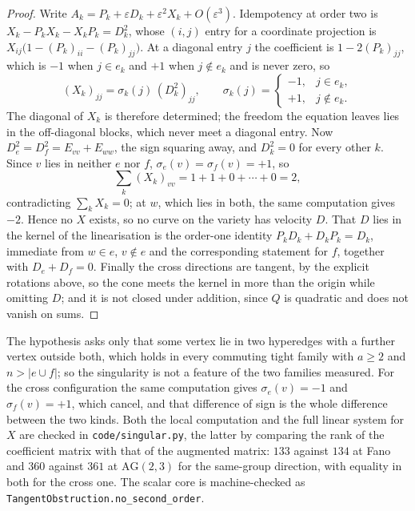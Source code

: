 \documentclass[11pt]{article}
\theoremstyle{remark}
\begin{document}
\begin{proof}
Write $A_k=P_k+\varepsilon D_k+\varepsilon^2X_k+O(\varepsilon^3)$. Idempotency at order two is
$X_k-P_kX_k-X_kP_k=D_k^2$, whose $(i,j)$ entry for a coordinate projection is
$X_{ij}\bigl(1-(P_k)_{ii}-(P_k)_{jj}\bigr)$. At a diagonal entry $j$ the coefficient is
$1-2(P_k)_{jj}$, which is $-1$ when $j\in e_k$ and $+1$ when $j\notin e_k$ and is never zero, so
\[
(X_k)_{jj}=\sigma_k(j)\,(D_k^2)_{jj},\qquad
\sigma_k(j)=\begin{cases}-1,& j\in e_k,\\ +1,& j\notin e_k.\end{cases}
\]
The diagonal of $X_k$ is therefore determined; the freedom the equation leaves lies in the
off-diagonal blocks, which never meet a diagonal entry. Now $D_e^2=D_f^2=E_{vv}+E_{ww}$, the sign
squaring away, and $D_k^2=0$ for every other $k$. Since $v$ lies in neither $e$ nor $f$,
$\sigma_e(v)=\sigma_f(v)=+1$, so
\[
\sum_k(X_k)_{vv}=1+1+0+\cdots+0=2,
\]
contradicting $\sum_kX_k=0$; at $w$, which lies in both, the same computation gives $-2$. Hence no
$X$ exists, so no curve on the variety has velocity $D$. That $D$ lies in the kernel of the
linearisation is the order-one identity $P_kD_k+D_kP_k=D_k$, immediate from $w\in e$, $v\notin e$
and the corresponding statement for $f$, together with $D_e+D_f=0$. Finally the cross directions
are tangent, by the explicit rotations above, so the cone meets the kernel in more than the
origin while omitting $D$; and it is not closed under addition, since $Q$ is quadratic and does not
vanish on sums.
\end{proof}

The hypothesis asks only that some vertex lie in two hyperedges with a further vertex outside
both, which holds in every commuting tight family with $a\ge2$ and $n>|e\cup f|$; so the
singularity is not a feature of the two families measured. For the cross configuration the same
computation gives $\sigma_e(v)=-1$ and $\sigma_f(v)=+1$, which cancel, and that difference of sign
is the whole difference between the two kinds. Both the local computation and the full linear
system for $X$ are checked in \texttt{code/singular.py}, the latter by comparing the rank of the
coefficient matrix with that of the augmented matrix: $133$ against $134$ at Fano and $360$
against $361$ at $\mathrm{AG}(2,3)$ for the same-group direction, with equality in both for the
cross one. The scalar core is machine-checked as \texttt{TangentObstruction.no\_second\_order}.
\end{document}
